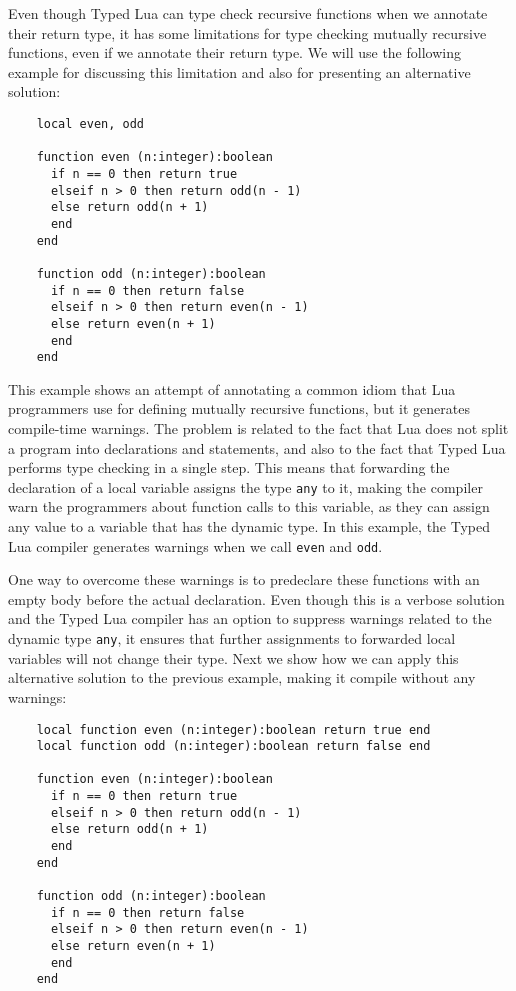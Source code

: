Even though Typed Lua can type check recursive functions when we
annotate their return type, it has some limitations for type checking
mutually recursive functions, even if we annotate their return type.
We will use the following example for discussing this limitation and
also for presenting an alternative solution:
\begin{verbatim}
    local even, odd

    function even (n:integer):boolean
      if n == 0 then return true
      elseif n > 0 then return odd(n - 1)
      else return odd(n + 1)
      end
    end

    function odd (n:integer):boolean
      if n == 0 then return false
      elseif n > 0 then return even(n - 1)
      else return even(n + 1)
      end
    end
\end{verbatim}

This example shows an attempt of annotating a common idiom that Lua
programmers use for defining mutually recursive functions, but it
generates compile-time warnings.
The problem is related to the fact that Lua does not split a program
into declarations and statements, and also to the fact that Typed Lua
performs type checking in a single step.
This means that forwarding the declaration of a local variable assigns
the type \texttt{any} to it, making the compiler warn the programmers
about function calls to this variable, as they can assign any value
to a variable that has the dynamic type.
In this example, the Typed Lua compiler generates warnings when we
call \texttt{even} and \texttt{odd}.

One way to overcome these warnings is to predeclare these functions
with an empty body before the actual declaration.
Even though this is a verbose solution and the Typed Lua compiler
has an option to suppress warnings related to the dynamic type
\texttt{any}, it ensures that further assignments to forwarded
local variables will not change their type.
Next we show how we can apply this alternative solution to the
previous example, making it compile without any warnings:
\begin{verbatim}
    local function even (n:integer):boolean return true end
    local function odd (n:integer):boolean return false end

    function even (n:integer):boolean
      if n == 0 then return true
      elseif n > 0 then return odd(n - 1)
      else return odd(n + 1)
      end
    end

    function odd (n:integer):boolean
      if n == 0 then return false
      elseif n > 0 then return even(n - 1)
      else return even(n + 1)
      end
    end
\end{verbatim}

